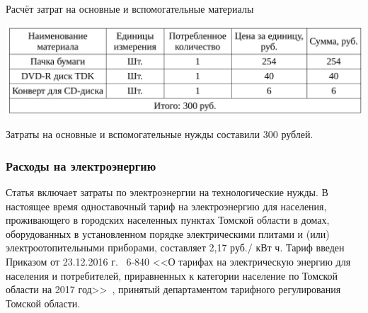 \begin{table}[!ht]
\caption{Расчёт затрат на основные и вспомогательные материалы}
\centering
\includegraphics[page=1, width=1\linewidth]{tables/economics/econom.pdf}
\label{tab:eco_6}
\end{table}

Затраты на основные и вспомогательные нужды составили 300 рублей.



\subsubsection{Расходы на электроэнергию}

Статья включает затраты по электроэнергии на технологические нужды. В настоящее время одноставочный
тариф на электроэнергию для населения, проживающего в городских населенных
пунктах Томской области в домах, оборудованных в установленном порядке электрическими 
плитами и (или) электроотопительными приборами,
составляет 2,17 руб./ кВт ч. Тариф введен 
Приказом от 23.12.2016 г. \textnumero~6-840 <<О тарифах на электрическую энергию для населения и 
потребителей, приравненных к категории население по Томской области на 2017 год>>~\cite{electr}, 
принятый департаментом тарифного регулирования Томской области.

